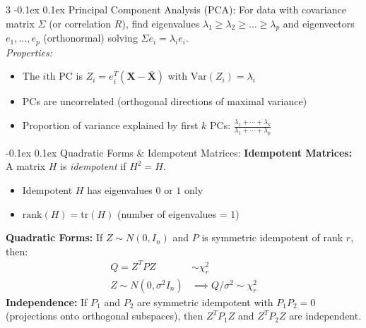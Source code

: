 \documentclass[10pt]{article}
\makeatletter
\renewcommand{\section}{\@startsection{section}{1}{0mm}
  {-0.1ex}%
  {0.1ex}%
  {\normalfont\normalsize\bfseries\color{thm-color}}}
\newcommand{\vect}[1]{\symbf{#1}} %
\makeatother
\begin{document}
\begin{multicols}{3}
  \section{Principal Component Analysis (PCA):}
  For data with covariance matrix \( \Sigma \) (or correlation \( R \)), find eigenvalues \( \lambda_1\ge\lambda_2\ge\dots\ge\lambda_p \) and eigenvectors \( e_1,\dots,e_p \) (orthonormal) solving \( \Sigma e_i=\lambda_i e_i. \)\\[0em]
  \textit{Properties:}
  \begin{itemize}[left=0pt,labelsep=1pt,itemsep=0pt]
    \item The \( i \)th PC is \( Z_i = e_i^T (\vect{X}-\bar{\vect{X}}) \) with \( \mathrm{Var}(Z_i)=\lambda_i \)
    \item PCs are uncorrelated (orthogonal directions of maximal variance)
    \item Proportion of variance explained by first \( k \) PCs: \( \frac{\lambda_1+\cdots+\lambda_k}{\lambda_1+\cdots+\lambda_p} \)
  \end{itemize}
  \section{Quadratic Forms \& Idempotent Matrices:}
  \textbf{Idempotent Matrices:} A matrix \( H \) is \textit{idempotent} if \( H^2=H \).
  \begin{itemize}[left=0pt,labelsep=1pt,itemsep=0pt]
    \item Idempotent \( H \) has eigenvalues \( 0 \) or \( 1 \) only
    \item \( \mathrm{rank}(H)=\mathrm{tr}(H) \) (number of eigenvalues = 1)
  \end{itemize}
  \textbf{Quadratic Forms:} If \( Z\sim N(0,I_n) \) and \( P \) is symmetric idempotent of rank \( r \), then:
  \begin{align*}
    Q=Z^T P Z               & \sim \chi^2_{r}                     \\
    Z\sim N(0,\sigma^2 I_n) & \implies Q/\sigma^2 \sim \chi^2_{r}
  \end{align*}
  \textbf{Independence:} If \( P_1 \) and \( P_2 \) are symmetric idempotent with \( P_1 P_2 = 0 \) (projections onto orthogonal subspaces), then \( Z^T P_1 Z \) and \( Z^T P_2 Z \) are independent.


\end{multicols}
\end{document}
